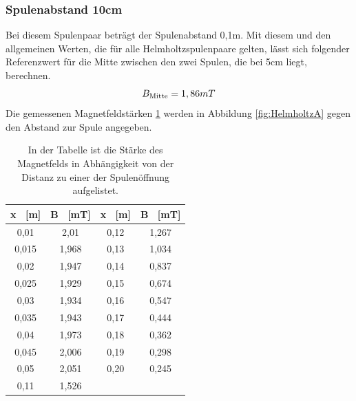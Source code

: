 \documentclass[titlepage = firstcover]{scrartcl}
\begin{document}
            \subsubsection{Spulenabstand 10cm}
            Bei diesem Spulenpaar beträgt der Spulenabstand 0,1m. Mit diesem und den allgemeinen Werten, die für alle Helmholtzspulenpaare gelten, lässt sich
            folgender Referenzwert für die Mitte zwischen den zwei Spulen, die bei 5cm liegt, berechnen.
            \begin{equation}
                B_{\text{Mitte}} = 1,86 mT\\
                \label{eqn:HelmA}
            \end{equation}
            Die gemessenen Magnetfeldstärken \ref{tab:HelmholtzA} werden in Abbildung \ref{fig:HelmholtzA} gegen den Abstand zur Spule angegeben.
            \begin{table}[h]
                \centering 
                \caption{In der Tabelle ist die Stärke des Magnetfelds in Abhängigkeit von der Distanz zu einer der Spulenöffnung aufgelistet.}
                \label{tab:HelmholtzA}

                \begin{tabular}{c c c c}
                    \toprule
                    {x \ [m]} & {B \ [mT]} & {x \ [m]} & {B \ [mT]} \\
                    \midrule
                    0,01  & 2,01  & 0,12 & 1,267 \\
                    0,015 & 1,968 & 0,13 & 1,034 \\
                    0,02  & 1,947 & 0,14 & 0,837 \\
                    0,025 & 1,929 & 0,15 & 0,674 \\
                    0,03  & 1,934 & 0,16 & 0,547 \\
                    0,035 & 1,943 & 0,17 & 0,444 \\
                    0,04  & 1,973 & 0,18 & 0,362 \\
                    0,045 & 2,006 & 0,19 & 0,298 \\
                    0,05  & 2,051 & 0,20 & 0,245 \\
                    0,11  & 1,526 & & \\
                    \bottomrule
                \end{tabular}                
            \end{table}
\end{document}
